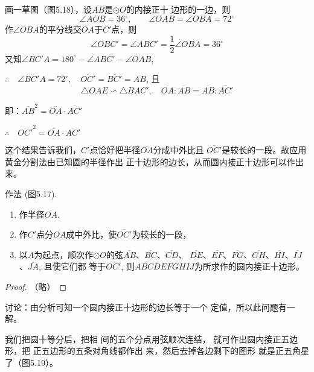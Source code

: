\begin{analyze}
    画一草图（图5.18），设$\overline{AB}$是$\odot O$的内接正十
边形的一边，则
\[\angle AOB=36^{\circ},\qquad \angle OAB=\angle OBA=72^{\circ}\]
作$\angle OBA$的平分线交$\overline{OA}$于$C'$点，则
\[\angle OBC'=\angle ABC'=\frac{1}{2}\angle OBA=36^{\circ}\]
又知$\angle BC'A=180^{\circ}-\angle ABC'-\angle OAB$,

$\therefore\quad \angle BC'A=72^{\circ},\quad 
\overline{OC'}=\overline{BC'}=\overline{AB}$, 且
$$\triangle OAE\backsim \triangle BAC',\quad \overline{OA}:\overline{AB}=\overline{AB}:\overline{AC'}$$

即：$\overline{AB}^2=\overline{OA}\cdot \overline{AC'}$

$\therefore\quad \overline{OC'}^2=\overline{OA}\cdot \overline{AC'}$
\end{analyze}

这个结果告诉我们，$C'$点恰好把半径$\overline{OA}$分成中外比且
$\overline{OC'}$是较长的一段。故应用黄金分割法由已知圆的半径作出
正十边形的边长，从而圆内接正十边形可以作出来。

作法 (图5.17).
\begin{enumerate}
\item 作半径$\overline{OA}$.
\item 作$C'$点分$\overline{OA}$成中外比，使$\overline{OC'}$为较长的一段，
\item 以$A$为起点，顺次作$\odot O$的弦$\overline{AB}$、$\overline{BC}$、$\overline{CD}$、
$\overline{DE}$、$\overline{EF}$、$\overline{FG}$、$\overline{GH}$、$\overline{HI}$、$\overline{IJ}$、$\overline{JA}$, 且使它们都
等于$\overline{OC'}$, 则$ABCDEFGHIJ$为所求作的圆内接正十边形。
\end{enumerate}



\begin{proof}
    （略）
\end{proof}

讨论：由分析可知一个圆内接正十边形的边长等于一个
定值，所以此问题有一解。

我们把圆十等分后，把相
间的五个分点用弦顺次连结，
就可作出圆内接正五边形，把
正五边形的五条对角线都作出
来，然后去掉各边剩下的图形
就是正五角星了（图5.19）。

